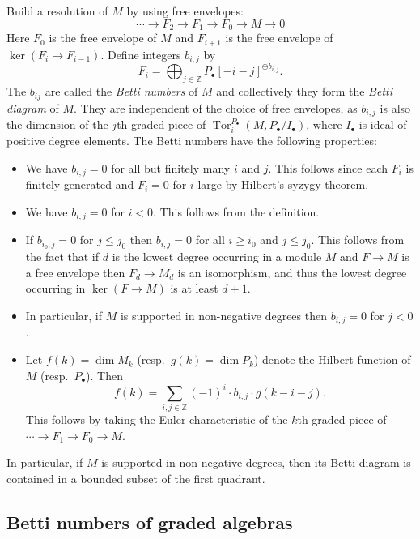 \documentclass{amsart}
\theoremstyle{definition}
\theoremstyle{remark}
\DeclareMathOperator{\Tor}{Tor}
\def\Z{\mathbb{Z}}
\begin{document}
Build a resolution of $M$ by using free envelopes:
\begin{displaymath}
\cdots \to F_2 \to F_1 \to F_0 \to M \to 0
\end{displaymath}
Here $F_0$ is the free envelope of $M$ and $F_{i+1}$ is the free envelope of $\ker(F_i \to F_{i-1})$.  Define integers
$b_{i, j}$ by
\begin{displaymath}
F_i=\bigoplus_{j \in \Z} P_{\bullet}[-i-j]^{\oplus b_{i, j}}.
\end{displaymath}
The $b_{ij}$ are called the \emph{Betti numbers} of $M$ and collectively they form  the \emph{Betti diagram} of $M$.
They are independent of the choice of free envelopes, as $b_{i, j}$ is also the dimension of the $j$th graded piece of
$\Tor_i^{P_{\bullet}}(M, P_{\bullet}/I_{\bullet})$, where $I_{\bullet}$ is ideal of positive degree elements.  The Betti
numbers have the following properties:
\begin{itemize}
\item[(B1)] We have $b_{i, j}=0$ for all but finitely many $i$ and $j$.  This follows since each $F_i$ is finitely
generated and $F_i=0$ for $i$ large by Hilbert's syzygy theorem.
\item[(B2)] We have $b_{i, j}=0$ for $i<0$.  This follows from the definition.
\item[(B3)] If $b_{i_0, j}=0$ for $j \le j_0$ then $b_{i, j}=0$ for all $i \ge i_0$ and $j \le j_0$.  This follows from
the fact that if $d$ is the lowest degree occurring in a module $M$ and $F \to M$ is a free envelope then $F_d \to M_d$
is an isomorphism, and thus the lowest degree occurring in $\ker(F \to M)$ is at least $d+1$.
\item[(B4)] In particular, if $M$ is supported in non-negative degrees then $b_{i, j}=0$ for $j<0$.
\item[(B5)] Let $f(k)=\dim{M_k}$ (resp.\ $g(k)=\dim{P_k}$) denote the Hilbert function of $M$ (resp.\ $P_{\bullet}$).
Then
\begin{displaymath}
f(k)=\sum_{i, j \in \Z} (-1)^i \cdot b_{i, j} \cdot g(k-i-j).
\end{displaymath}
This follows by taking the Euler characteristic of the $k$th graded piece of $\cdots \to F_1 \to F_0 \to M$.
\end{itemize}
In particular,  if $M$ is supported in non-negative degrees, then its Betti diagram is contained in a bounded subset of
the first quadrant.


\subsection{Betti numbers of graded algebras}
\end{document}
